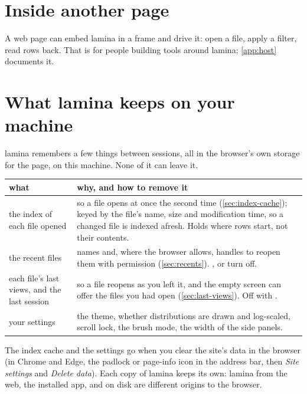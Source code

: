 \section{Inside another page}

A web page can embed lamina in a frame and drive it: open a file, apply a filter, read rows back. That is
for people building tools around lamina; \cref{app:host} documents it.

\section{What lamina keeps on your machine}\label{sec:local-state}

lamina remembers a few things between sessions, all in the browser's own storage for the page, on this
machine. None of it can leave it.

\begin{center}\small
\begin{tabularx}{\linewidth}{@{}lL@{}}
\toprule
\sffamily\bfseries what & \sffamily\bfseries why, and how to remove it \\
\midrule
the index of each file opened & so a file opens at once the second time (\cref{sec:index-cache}); keyed
by the file's name, size and modification time, so a changed file is indexed afresh. Holds where rows
start, not their contents. \\
the recent files & names and, where the browser allows, handles to reopen them with permission
(\cref{sec:recents}). , or turn  off. \\
each file's last views, and the last session & so a file reopens as you left it, and the empty screen can
offer the files you had open (\cref{sec:last-views}). Off with . \\
your settings & the theme, whether distributions are drawn and log-scaled, scroll lock, the brush mode,
the width of the side panels. \\
\bottomrule
\end{tabularx}
\end{center}

The index cache and the settings go when you clear the site's data in the browser (in Chrome and Edge,
the padlock or page-info icon in the address bar, then \emph{Site settings} and \emph{Delete data}).
Each copy of lamina keeps its own: lamina from the web, the installed app, and  on
disk are different origins to the browser.
